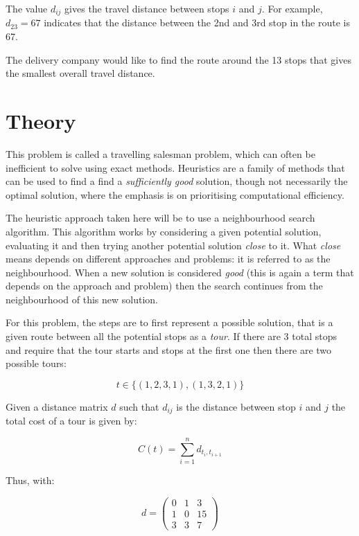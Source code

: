 The value \(d_{ij}\) gives the travel distance between
stops \(i\) and \(j\). For example, \(d_{23}=67\) %
indicates that the distance between the 2nd and 3rd stop in the route is 67. %


The delivery company would like to find the route around the 13 stops that gives
the smallest overall travel distance.


\section{Theory}\label{sec:theory}

This problem is called a travelling salesman problem, which can
often be inefficient to solve using exact
methods\autocite{michalewicz2013solve}.
Heuristics are a family of methods that can be used to find a find a
\emph{sufficiently good} solution, though not necessarily the optimal solution,
where the emphasis is on prioritising computational efficiency.

The heuristic approach taken here will be to use a neighbourhood search algorithm.
This algorithm works by considering a given potential solution, evaluating it
and then trying another potential solution \emph{close} to it. What \emph{close}
means depends on different approaches and problems: it is referred to as the
neighbourhood. When a new solution is considered \emph{good} (this is
again a term that depends on the approach and problem) then the search
continues from the neighbourhood of this new solution.

For this problem, the steps are to first represent a possible solution, that is a given route
between all the potential stops as a \emph{tour}. If there are 3 total stops
and require that the tour starts and stops at the first one then there are two
possible tours:

\[
    t \in \{(1, 2, 3, 1), (1, 3, 2, 1)\}
\]

Given a distance matrix \(d\) such that \(d_{ij}\) is the distance between stop
\(i\) and \(j\) the total cost of a tour is given by:

\[
    C(t)=\sum_{i=1}^{n} d_{t_i, t_{i + 1}}
\]

Thus, with:

\[
    d = \begin{pmatrix}
        0 & 1 & 3\\
        1 & 0 & 15\\
        3 & 3 & 7
        \end{pmatrix}
\]


